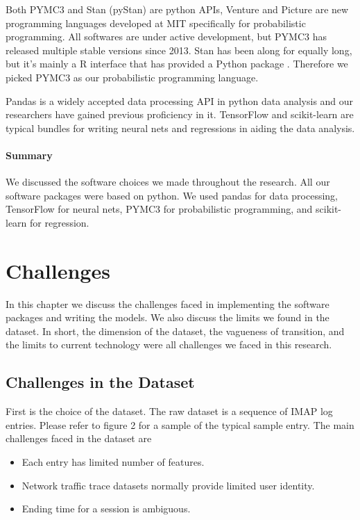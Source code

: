 \documentclass[]{article}
\begin{document}
Both PYMC3 and Stan (pyStan) are python APIs, Venture and Picture are new programming languages developed at MIT specifically for probabilistic programming. All softwares are under active development, but PYMC3 has released multiple stable versions since 2013. Stan has been along for equally long, but it's mainly a R interface that has provided a Python package \cite{pymcstan}. Therefore we picked PYMC3 as our probabilistic programming language.

Pandas is a widely accepted data processing API in python data analysis and our researchers have gained previous proficiency in it. TensorFlow and scikit-learn are typical bundles for writing neural nets and regressions in aiding the data analysis. 

\paragraph{Summary}

We discussed the software choices we made throughout the research. All our software packages were based on python. We used pandas for data processing, TensorFlow for neural nets, PYMC3 for probabilistic programming, and scikit-learn for regression.

\newpage
\section{Challenges}

In this chapter we discuss the challenges faced in implementing the software packages and writing the models. We also discuss the limits we found in the dataset. In short, the dimension of the dataset, the vagueness of transition, and the limits to current technology were all challenges we faced in this research.

\subsection{Challenges in the Dataset}

First is the choice of the dataset. The raw dataset is a sequence of IMAP log entries. Please refer to figure 2 for a sample of the typical sample entry. The main challenges faced in the dataset are

\begin{itemize}
\item
Each entry has limited number of features.
\item
Network traffic trace datasets normally provide limited user identity.
\item
Ending time for a session is ambiguous.
\end{itemize}
\end{document}
